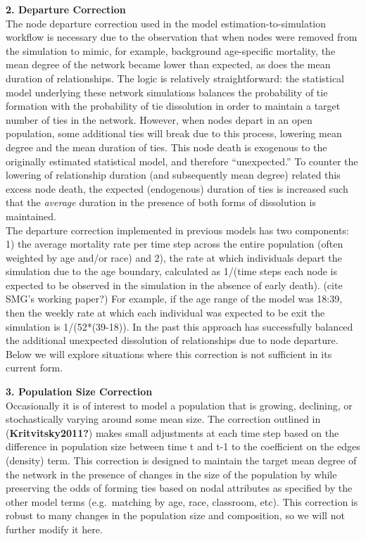 \documentclass [11pt, proquest] {uwthesis}[2015/03/03]
\begin{document}
\textbf{2. Departure Correction}\\
The node departure correction used in the model estimation-to-simulation workflow is necessary due to the observation that when nodes were removed from the simulation to mimic, for example, background age-specific mortality, the mean degree of the network became lower than expected, as does the mean duration of relationships. The logic is relatively straightforward: the statistical model underlying these network simulations balances the probability of tie formation with the probability of tie dissolution in order to maintain a target number of ties in the network. However, when nodes depart in an open population, some additional ties will break due to this process, lowering mean degree and the mean duration of ties. This node death is exogenous to the originally estimated statistical model, and therefore ``unexpected.'' To counter the lowering of relationship duration (and subsequently mean degree) related this excess node death, the expected (endogenous) duration of ties is increased such that the \emph{average} duration in the presence of both forms of dissolution is maintained.\\
The departure correction implemented in previous models has two components: 1) the average mortality rate per time step across the entire population (often weighted by age and/or race) and 2), the rate at which individuals depart the simulation due to the age boundary, calculated as 1/(time steps each node is expected to be observed in the simulation in the absence of early death). (cite SMG's working paper?) For example, if the age range of the model was 18:39, then the weekly rate at which each individual was expected to be exit the simulation is 1/(52*(39-18)). In the past this approach has successfully balanced the additional unexpected dissolution of relationships due to node departure. Below we will explore situations where this correction is not sufficient in its current form.

\textbf{3. Population Size Correction}\\
Occasionally it is of interest to model a population that is growing, declining, or stochastically varying around some mean size. The correction outlined in (\textbf{Kritvitsky2011?}) makes small adjustments at each time step based on the difference in population size between time t and t-1 to the coefficient on the edges (density) term. This correction is designed to maintain the target mean degree of the network in the presence of changes in the size of the population by while preserving the odds of forming ties based on nodal attributes as specified by the other model terms (e.g.~matching by age, race, classroom, etc). This correction is robust to many changes in the population size and composition, so we will not further modify it here.
\end{document}
